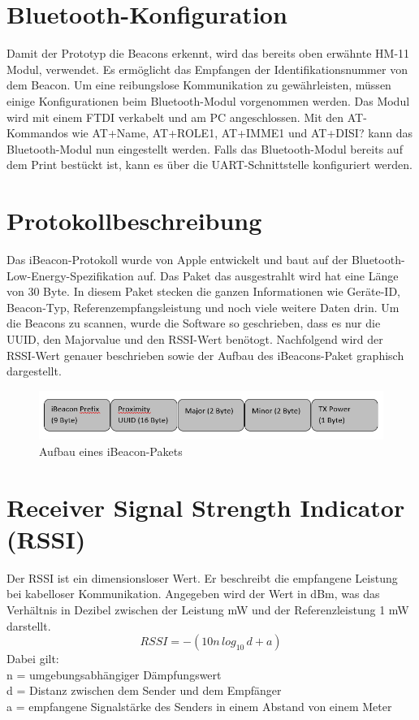 \section{Bluetooth-Konfiguration}
Damit der Prototyp die Beacons erkennt, wird das bereits oben erwähnte HM-11 Modul, verwendet. Es ermöglicht das Empfangen der Identifikationsnummer von dem Beacon. Um eine reibungslose Kommunikation zu gewährleisten, müssen einige Konfigurationen beim Bluetooth-Modul vorgenommen werden. Das Modul wird mit einem FTDI verkabelt und am PC angeschlossen. Mit den AT-Kommandos wie AT+Name, AT+ROLE1, AT+IMME1 und AT+DISI? kann das Bluetooth-Modul nun eingestellt werden. Falls das Bluetooth-Modul bereits auf dem Print bestückt ist, kann es über die UART-Schnittstelle konfiguriert werden. 

\section{Protokollbeschreibung}
Das iBeacon-Protokoll wurde von Apple entwickelt und baut auf der Bluetooth-Low-Energy-Spezifikation auf. Das Paket das ausgestrahlt wird hat eine Länge von 30 Byte. In diesem Paket stecken die ganzen Informationen wie Geräte-ID, Beacon-Typ, Referenzempfangsleistung und noch viele weitere Daten drin. Um die Beacons zu scannen, wurde die Software so geschrieben, dass es nur die UUID, den Majorvalue und den RSSI-Wert benötogt. Nachfolgend wird der RSSI-Wert genauer beschrieben sowie der Aufbau des iBeacons-Paket graphisch dargestellt. \cite{Indoorpos}

\begin{figure}[htp]
\centering
\includegraphics[width=15cm]{Bilder/iBeacon_Paket.PNG}
\caption{Aufbau eines iBeacon-Pakets}
\label{fig:iBeacon}
\end{figure}

\section{Receiver Signal Strength Indicator (RSSI)}
Der RSSI ist ein dimensionsloser Wert. Er beschreibt die empfangene Leistung bei kabelloser Kommunikation. Angegeben wird der Wert in dBm, was das Verhältnis in Dezibel zwischen der Leistung mW und der Referenzleistung 1 mW darstellt.
\begin{equation}
    RSSI = -(10n\,log_{10}\,d+a)
\end{equation}
Dabei gilt: \\
\hspace*{10mm}
n = umgebungsabhängiger Dämpfungswert \\
\hspace*{10mm}
d = Distanz zwischen dem Sender und dem Empfänger \\
\hspace*{10mm}
a = empfangene Signalstärke des Senders in einem Abstand von einem Meter \\
\newpage
